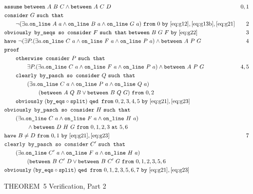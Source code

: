 \begin{boxedfigure}
\scriptsize
  \begin{align*}
    &\code{assume}\ \between{A}{B}{C} \wedge \between{A}{C}{D} & 0,1\\
    &\code{consider}\ G\ \code{such that}\\
    &\qquad\Triangle{a}{A}{B}{G}\ \code{from}\ 0\ \code{by}\ \eqref{eq:g12},\eqref{eq:g13b},\eqref{eq:g21}&2\\
    &\code{obviously by\_neqs so consider}\ F\ \code{such that}\ \between{B}{G}{F}\ \code{by}\ \eqref{eq:g22}&3\\
    &\code{have}\ \neg(\exists P. (\exists a. \code{on\_line}\ C\ a\wedge\code{on\_line}\ F\ a\wedge\code{on\_line}\ P\ a)\wedge\between{A}{P}{G} & 4\\
    &\code{proof}\\
    &\qquad \code{otherwise consider}\ P\ \code{such that}\\
    &\qquad\qquad \exists P. (\exists a. \code{on\_line}\ C\ a\wedge\code{on\_line}\ F\ a\wedge\code{on\_line}\ P\ a) \wedge\between{A}{P}{G}& 4,5\\
    &\qquad\code{clearly by\_pasch so consider}\ Q\ \code{such that}\\
    &\qquad\qquad(\exists a. \code{on\_line}\ C\ a\wedge\code{on\_line}\ P\ a\wedge\code{on\_line}\ Q\ a)\\
    &\qquad\qquad\qquad(\between{A}{Q}{B} \vee \between{B}{Q}{G})\ \code{from}\ 0,2\\
    &\qquad\code{obviously}\ (\code{by\_eqs}\circ\code{split})\ \code{qed from}\ 0,2,3,4,5\ \code{by}\ \eqref{eq:g21},\eqref{eq:g23}\\
    &\code{obviously by\_pasch so consider}\ H\ \code{such that}\\
    &\qquad(\exists a. \code{on\_line}\ C\ a\wedge\code{on\_line}\ F\ a\wedge\code{on\_line}\ H\ a)\\
    &\qquad\qquad\wedge\between{D}{H}{G}\ \code{from}\ 0,1,2,3\ \code{at}\ 5,6\\
    &\code{have}\ B\neq D\ \code{from}\ 0,1\ \code{by}\ \eqref{eq:g21},\eqref{eq:g23} & 7\\
    &\code{clearly by\_pasch so consider}\ C'\ \code{such that}\\
    &\qquad (\exists a. \code{on\_line}\ C'\ a\wedge\code{on\_line}\ F\ a\wedge\code{on\_line}\ H\ a)\\
    &\qquad\qquad(\between{B}{C'}{D} \vee \between{B}{C'}{G}\ \code{from}\ 0,1,2,3,5,6\\
    &\code{obviously}\ (\code{by\_eqs}\circ\code{split})\ \code{qed from}\ 0,1,2,3,5,6,7\ \code{by}\ \eqref{eq:g21},\eqref{eq:g23}
  \end{align*}
  \caption{THEOREM~5 Verification, Part 2}
  \label{fig:FiveVerification2}
\end{boxedfigure}

